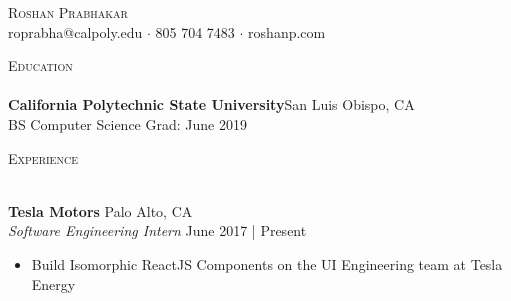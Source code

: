 \documentclass[a4paper]{article}
\newcommand{\lineunder} {
    \vspace*{-8pt} \\
    \hspace*{-18pt} \hrulefill \\
}
\newcommand{\header} [1] {
    {\hspace*{-18pt}\vspace*{6pt} \textsc{#1}}
    \vspace*{-6pt} \lineunder
}
\begin{document}
\vspace*{-40pt}

\vspace*{-10pt}
\begin{center}
	{\Huge \scshape {Roshan Prabhakar}}\\
	roprabha@calpoly.edu $\cdot$ 805 704 7483 $\cdot$ roshanp.com\\
\end{center}

\vspace*{2mm}

\header{Education}
\textbf{California Polytechnic State University}\hfill San Luis Obispo, CA\\
BS Computer Science \hfill Grad: June 2019\\
\vspace{2mm}

\vspace*{2mm}

\header{Experience}
\vspace{1mm}

\textbf{Tesla Motors} \hfill Palo Alto, CA\\
\textit{Software Engineering Intern} \hfill June 2017 | Present\\
\vspace{-1mm}
\begin{itemize} \itemsep 1pt
	\item Build Isomorphic ReactJS Components on the UI Engineering team at Tesla Energy
\end{itemize}

        

\vspace*{2mm}

        

\vspace*{2mm}

        

\ 
\end{document}
